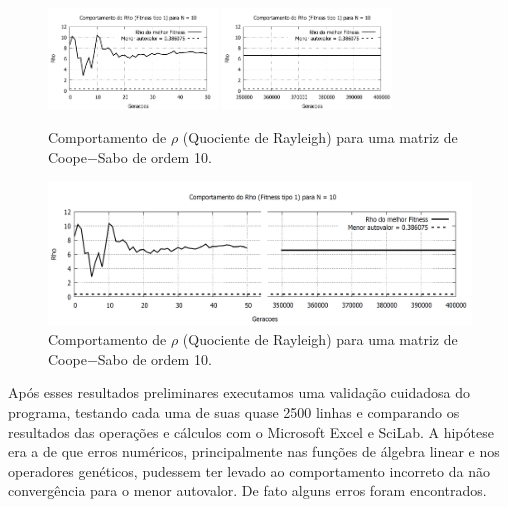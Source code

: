 	\begin{figure}[htbp]
		\centering
			\includegraphics[width=0.40\textwidth]{figs/resultados/rho_N10_g50.pdf}
			\includegraphics[width=0.40\textwidth]{figs/resultados/rho_N10_g400000.pdf}
		\caption{Comportamento de $\rho$ (Quociente de Rayleigh) para uma matriz de Coope$-$Sabo de ordem 10.}
		\label{fig:rho_N10}
	\end{figure}
	
	\newpage
	\begin{landscape}
	\begin{figure}[p]
		\centering
			\includegraphics[width=1.3\textwidth]{figs/resultados/rho_N10.png}
		\caption{Comportamento de $\rho$ (Quociente de Rayleigh) para uma matriz de Coope$-$Sabo de ordem 10.}
		\label{fig:rho_N10_completa}
	\end{figure}
	\end{landscape}
	\newpage
			
	Após esses resultados preliminares executamos uma validação cuidadosa do programa, testando cada uma de suas quase 2500 linhas e comparando os resultados das operações e cálculos com o Microsoft Excel e SciLab. A hipótese era a de que erros numéricos, principalmente nas funções de álgebra linear e nos operadores genéticos, pudessem ter levado ao comportamento incorreto da não convergência para o menor autovalor. De fato alguns erros foram encontrados.
	
